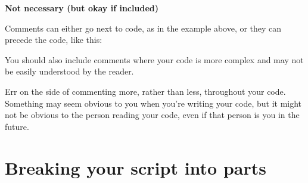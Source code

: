 \documentclass[]{book}
\newenvironment{Shaded}{\begin{snugshade}}{\end{snugshade}}
\newcommand{\CommentTok}[1]{\textcolor[rgb]{0.56,0.35,0.01}{\textit{#1}}}
\newcommand{\DecValTok}[1]{\textcolor[rgb]{0.00,0.00,0.81}{#1}}
\newcommand{\KeywordTok}[1]{\textcolor[rgb]{0.13,0.29,0.53}{\textbf{#1}}}
\newcommand{\NormalTok}[1]{#1}
\newcommand{\OperatorTok}[1]{\textcolor[rgb]{0.81,0.36,0.00}{\textbf{#1}}}
\newcommand{\StringTok}[1]{\textcolor[rgb]{0.31,0.60,0.02}{#1}}
\begin{document}
\begin{Shaded}
\end{Shaded}

\textbf{Not necessary (but okay if included)}

\begin{Shaded}
\end{Shaded}

Comments can either go next to code, as in the example above, or they can precede the code, like this:

\begin{Shaded}
\end{Shaded}

You should also include comments where your code is more complex and may not be easily understood by the reader.

Err on the side of commenting more, rather than less, throughout your code. Something may seem obvious to you when you're writing your code, but it might not be obvious to the person reading your code, even if that person is you in the future.

\hypertarget{breaking-your-script-into-parts}{%
\section{Breaking your script into parts}\label{breaking-your-script-into-parts}}
\end{document}
